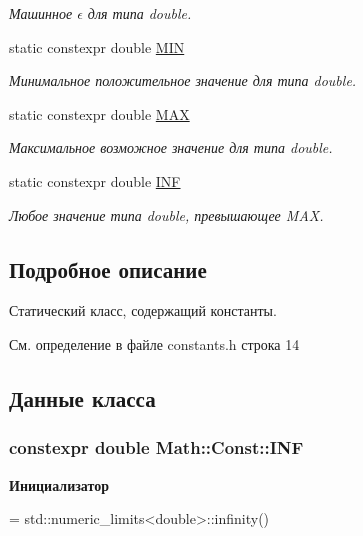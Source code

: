 \begin{DoxyCompactItemize}
\begin{DoxyCompactList}\small\item\em Машинное $\epsilon$ для типа double. \end{DoxyCompactList}\item 
static constexpr double \hyperlink{class_math_1_1_const_a787c7176528a33522741da6b45761378}{M\+IN}
\begin{DoxyCompactList}\small\item\em Минимальное положительное значение для типа double. \end{DoxyCompactList}\item 
static constexpr double \hyperlink{class_math_1_1_const_aa6f0fbdf83bf388173d9712c2a9d2046}{M\+AX}
\begin{DoxyCompactList}\small\item\em Максимальное возможное значение для типа double. \end{DoxyCompactList}\item 
static constexpr double \hyperlink{class_math_1_1_const_a66b00ab50323d42c344eb25a680f1918}{I\+NF}
\begin{DoxyCompactList}\small\item\em Любое значение типа double, превышающее M\+AX. \end{DoxyCompactList}\end{DoxyCompactItemize}


\subsection{Подробное описание}
Статический класс, содержащий константы. 

См. определение в файле constants.\+h строка 14



\subsection{Данные класса}
\subsubsection[{\texorpdfstring{I\+NF}{INF}}]{\setlength{\rightskip}{0pt plus 5cm}constexpr double Math\+::\+Const\+::\+I\+NF\hspace{0.3cm}{\ttfamily [static]}}\hypertarget{class_math_1_1_const_a66b00ab50323d42c344eb25a680f1918}{}\label{class_math_1_1_const_a66b00ab50323d42c344eb25a680f1918}
{\bfseries Инициализатор}
\begin{DoxyCode}
=
        std::numeric\_limits<double>::infinity()
\end{DoxyCode}


